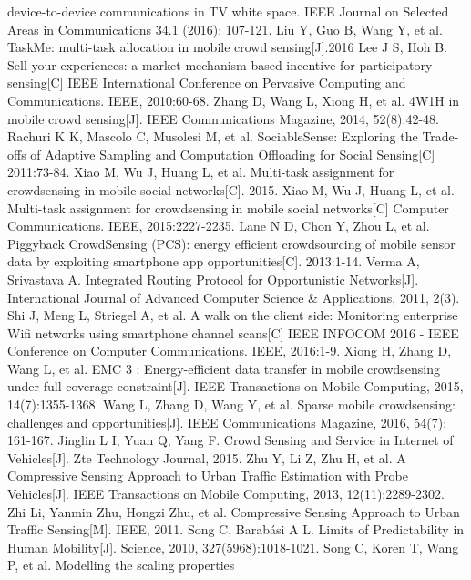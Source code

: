 \documentclass[UTF8]{ctexart}
\begin{document}
\begin{thebibliography}{99}
  device-to-device communications in TV white space. IEEE Journal on Selected
  Areas in Communications 34.1 (2016): 107-121.
   Liu Y, Guo B, Wang Y, et al. TaskMe: multi-task allocation
  in mobile crowd sensing[J].2016
   Lee J S, Hoh B. Sell your experiences: a market mechanism
  based incentive for participatory sensing[C] IEEE International Conference
  on Pervasive Computing and Communications. IEEE, 2010:60-68.
   Zhang D, Wang L, Xiong H, et al. 4W1H in mobile crowd
  sensing[J]. IEEE Communications Magazine, 2014, 52(8):42-48.
   Rachuri K K, Mascolo C, Musolesi M, et al. SociableSense:
  Exploring the Trade-offs of Adaptive Sampling and Computation Offloading for
  Social Sensing[C] 2011:73-84.
  	Xiao M, Wu J, Huang L, et al. Multi-task assignment for
  crowdsensing in mobile social networks[C]. 2015.
   Xiao M, Wu J, Huang L, et al. Multi-task assignment for
  crowdsensing in mobile social networks[C] Computer Communications. IEEE,
  2015:2227-2235.
  	Lane N D, Chon Y, Zhou L, et al. Piggyback CrowdSensing (PCS):
  energy efficient crowdsourcing of mobile sensor data by exploiting smartphone
  app opportunities[C]. 2013:1-14.
   Verma A, Srivastava A. Integrated Routing Protocol for
  Opportunistic Networks[J]. International Journal of Advanced Computer Science
  \& Applications, 2011, 2(3).
   Shi J, Meng L, Striegel A, et al. A walk on the client side:
  Monitoring  enterprise Wifi networks using smartphone channel scans[C]
  IEEE INFOCOM 2016 - IEEE Conference on Computer Communications. IEEE, 2016:1-9.
   Xiong H, Zhang D, Wang L, et al. EMC 3 : Energy-efficient data
  transfer in mobile crowdsensing under full coverage constraint[J]. IEEE
  Transactions on Mobile Computing, 2015, 14(7):1355-1368.
   Wang L, Zhang D, Wang Y, et al. Sparse mobile crowdsensing:
  challenges and opportunities[J]. IEEE Communications Magazine, 2016, 54(7):
  161-167.
   Jinglin L I, Yuan Q, Yang F. Crowd Sensing and Service in
  Internet of Vehicles[J]. Zte Technology Journal, 2015.
   Zhu Y, Li Z, Zhu H, et al. A Compressive Sensing Approach to
  Urban Traffic Estimation with Probe Vehicles[J]. IEEE Transactions on Mobile
  Computing, 2013, 12(11):2289-2302.
   Zhi Li, Yanmin Zhu, Hongzi Zhu, et al. Compressive Sensing
  Approach to Urban Traffic Sensing[M]. IEEE, 2011.
   Song C, Barabási A L. Limits of Predictability in Human Mobility[J].
  Science, 2010, 327(5968):1018-1021.
   Song C, Koren T, Wang P, et al. Modelling the scaling properties

\end{thebibliography}
\end{document}
